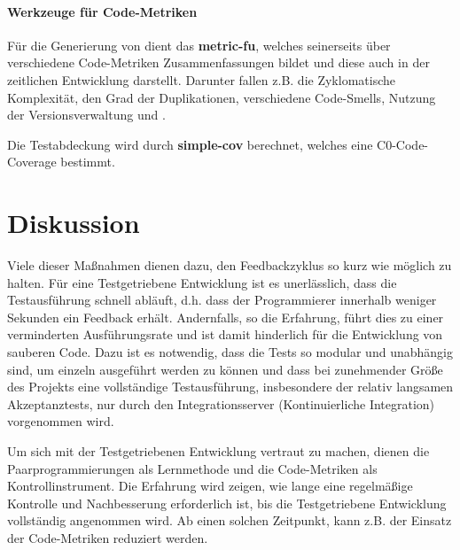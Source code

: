 \paragraph{Werkzeuge für Code-Metriken}  Für die Generierung von  dient das  \textbf{metric-fu}, welches seinerseits über verschiedene Code-Metriken Zusammenfassungen bildet und diese auch in der zeitlichen Entwicklung darstellt. Darunter fallen z.B. die Zyklomatische Komplexität, den Grad der Duplikationen, verschiedene Code-Smells, Nutzung der Versionsverwaltung und .

Die Testabdeckung wird durch \textbf{simple-cov} berechnet, welches eine C0-Code-Coverage bestimmt.


\section{Diskussion}

Viele dieser Maßnahmen dienen dazu, den Feedbackzyklus so kurz wie möglich zu halten. Für eine Testgetriebene Entwicklung ist es unerlässlich, dass die Testausführung schnell abläuft, d.h. dass der Programmierer innerhalb weniger Sekunden ein Feedback erhält. Andernfalls, so die Erfahrung, führt dies zu einer verminderten Ausführungsrate und ist damit hinderlich für die Entwicklung von sauberen Code. Dazu ist es notwendig, dass die Tests so modular und unabhängig sind, um einzeln ausgeführt werden zu können und dass bei zunehmender Größe des Projekts eine vollständige Testausführung, insbesondere der relativ langsamen Akzeptanztests, nur durch den Integrationsserver (Kontinuierliche Integration) vorgenommen wird.

Um sich mit der Testgetriebenen Entwicklung vertraut zu machen, dienen die Paarprogrammierungen als Lernmethode und die Code-Metriken als Kontrollinstrument. Die Erfahrung wird zeigen, wie lange eine regelmäßige Kontrolle und Nachbesserung erforderlich ist, bis die Testgetriebene Entwicklung vollständig angenommen wird. Ab einen solchen Zeitpunkt, kann z.B. der Einsatz der Code-Metriken reduziert werden.

